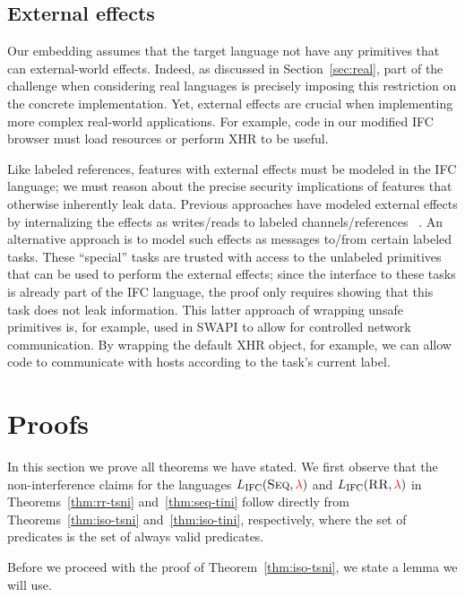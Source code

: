 \documentclass{sigplanconf}
\newcommand{\Red}[1]{{\color{red} #1}}
\newcommand{\tocite}[1]{\Red{\cite{#1}}}
\begin{document}
\subsection{External effects}
\label{sec:extensions:external}
Our embedding assumes that the target language not have any
primitives that can external-world effects.
%
Indeed, as discussed in Section~\ref{sec:real}, part of the challenge
when considering real languages is precisely imposing this restriction
on the concrete implementation.
%
Yet, external effects are crucial when implementing more complex
real-world applications.
%
For example, code in our modified IFC browser must load resources or
perform XHR to be useful.

Like labeled references, features with external effects must be
modeled in the IFC language; we must reason about the precise security
implications of features that otherwise inherently leak data.
%
Previous approaches have modeled external effects by internalizing the
effects as writes/reads to labeled channels/references~\tocite{}.
%
An alternative approach is to model such effects as messages to/from
certain labeled tasks.
%
These ``special'' tasks are trusted with access to the unlabeled
primitives that can be used to perform the external effects; since the
interface to these tasks is already part of the IFC language, the
proof only requires showing that this task does not leak information.
%
This latter approach of wrapping unsafe primitives is, for example,
used in SWAPI to allow for controlled network communication.
%
By wrapping the default XHR object, for example, we can allow code
to communicate with hosts according to the task's current label.
\section{Proofs}
\label{sec:proofs}

In this section we prove all theorems we have stated.
We first observe that the non-interference claims for the languages
\ensuremath{L_\text{IFC}(\textsc{Seq},\Red{\lambda})} and \ensuremath{L_\text{IFC}(\textsc{RR},\Red{\lambda})}
in Theorems~\ref{thm:rr-tsni} and~\ref{thm:seq-tini} follow directly
from Theorems~\ref{thm:iso-tsni} and~\ref{thm:iso-tini},
respectively, where the set
of predicates is the set of always valid predicates.

Before we proceed with the proof of Theorem~\ref{thm:iso-tsni},
we state a lemma we will use.
\end{document}
